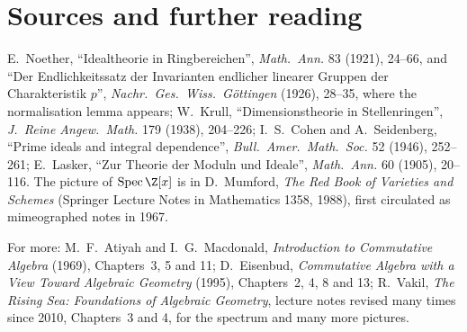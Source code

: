 \section*{Sources and further reading}

E.~Noether, ``Idealtheorie in Ringbereichen'', \emph{Math.\ Ann.} 83 (1921), 24--66, and ``Der Endlichkeitssatz der Invarianten endlicher linearer Gruppen der Charakteristik $p$'', \emph{Nachr.\ Ges.\ Wiss.\ Göttingen} (1926), 28--35, where
the normalisation lemma appears; W.~Krull, ``Dimensionstheorie in Stellenringen'', \emph{J.\ Reine Angew.\ Math.} 179 (1938), 204--226; I.~S.~Cohen and A.~Seidenberg, ``Prime ideals and integral dependence'', \emph{Bull.\ Amer.\ Math.\ Soc.} 52
(1946), 252--261; E.~Lasker, ``Zur Theorie der Moduln und Ideale'', \emph{Math.\ Ann.} 60 (1905), 20--116. The picture of $\operatorname{Spec}\Z[x]$ is in D.~Mumford, \emph{The Red Book of Varieties and Schemes} (Springer Lecture Notes in Mathematics 1358, 1988), first circulated as mimeographed notes in 1967.

For more: M.~F.~Atiyah and I.~G.~Macdonald, \emph{Introduction to Commutative Algebra} (1969), Chapters~3, 5 and 11; D.~Eisenbud, \emph{Commutative Algebra with a View Toward Algebraic Geometry} (1995), Chapters~2, 4, 8 and 13;
R.~Vakil, \emph{The Rising Sea: Foundations of Algebraic Geometry}, lecture notes revised many times since 2010, Chapters~3 and 4, for the spectrum and many more pictures.
